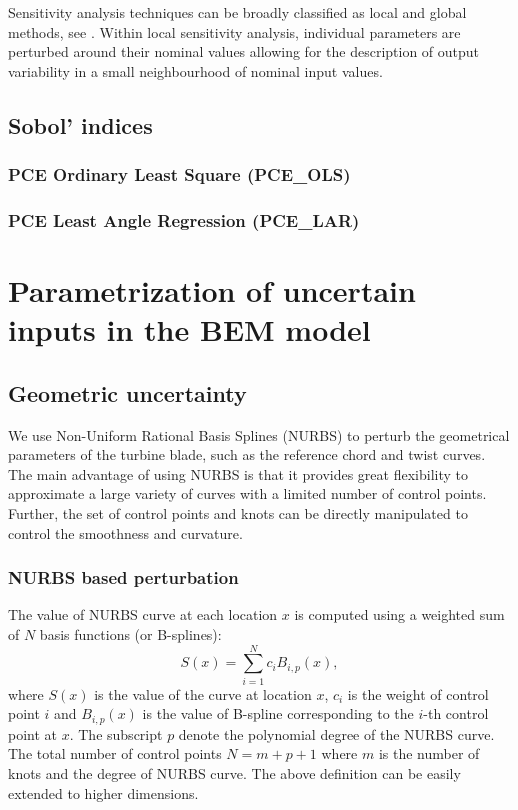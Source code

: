 \documentclass[review]{elsarticle}
\numberwithin{equation}{section}
\numberwithin{equation}{section}
\begin{document}
Sensitivity analysis techniques can be broadly classified as local and global methods, see \cite{ralphSmith}. Within local sensitivity analysis, individual parameters are perturbed around their nominal values allowing for the description of output variability in a small neighbourhood of nominal input values. %

\subsection{Sobol' indices}
\subsubsection{PCE Ordinary Least Square (PCE\_OLS)}
\subsubsection{PCE Least Angle Regression (PCE\_LAR)}
\section{Parametrization of uncertain inputs in the BEM model}
\subsection{Geometric uncertainty}
We use Non-Uniform Rational Basis Splines (NURBS) \cite{nurbs_book} to perturb the geometrical parameters of the turbine blade, such as the reference chord and twist curves. The main advantage of using NURBS is that it provides great flexibility to approximate a large variety of curves with a limited number of control points. Further, the set of control points and knots can be directly manipulated to control the smoothness and curvature.

\subsubsection{NURBS based perturbation}
The value of NURBS curve at each location $x$ is computed using a weighted sum of $N$ basis functions (or B-splines):
\begin{equation}\label{NURB_curve}
S(x)  = \sum_{i=1}^{N} c_iB_{i,p}(x),
\end{equation}
where $S(x)$ is the value of the curve at location $x$, $c_i$ is the weight of control point $i$ and $B_{i,p}(x)$ is the value of B-spline corresponding to the $i$-th control point at $x$. The subscript $p$ denote the polynomial degree of the NURBS curve. The total number of control points $N = m+p+1$ where $m$ is the number of knots  and the degree of NURBS curve. The above definition can be easily extended to higher dimensions. 
\end{document}
